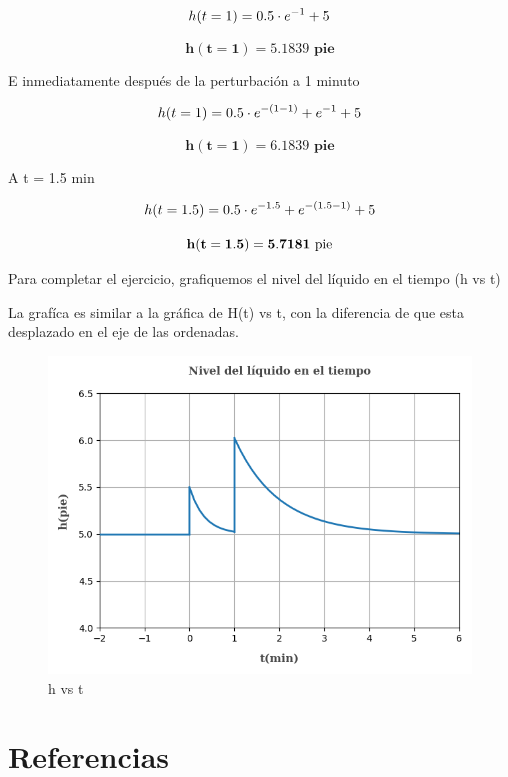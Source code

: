 \documentclass[
  letterpaper,
  DIV=11,
  numbers=noendperiod]{scrreprt}
\begin{document}
\[
h(t=1)= 0.5\cdot e^{-1} + 5\\
\]

\[
\mathbf{h(t=1)=5.1839\text{ pie}}
\]

E inmediatamente después de la perturbación a 1 minuto

\[
h(t=1)= 0.5\cdot e^{-(1-1)}+e^{-1} + 5\\
\]

\[
\mathbf{h(t=1) = 6.1839\text{ pie}}
\]

A t = 1.5 min

\[
h(t=1.5)= 0.5\cdot e^{-1.5} + e^{-(1.5-1)} + 5\\
\]

\[
\mathbf{h(t=1.5)= 5.7181\text{ pie}}\\
\]

Para completar el ejercicio, grafiquemos el nivel del líquido en el
tiempo (h vs t)

La grafíca es similar a la gráfica de H(t) vs t, con la diferencia de
que esta desplazado en el eje de las ordenadas.

\begin{figure}

{\centering \includegraphics{././images/p5.9-coughanowr/hvst.png}

}

\caption{h vs t}

\end{figure}

\hypertarget{referencias-6}{%
\section{Referencias}\label{referencias-6}}
\end{document}
